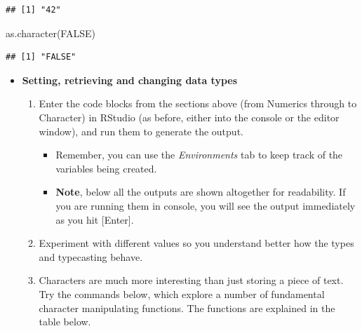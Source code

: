 \documentclass[a4paper]{book}
\newenvironment{Shaded}{}{}
\newcommand{\KeywordTok}[1]{\textcolor[rgb]{0.00,0.00,1.00}{{#1}}}
\newcommand{\OtherTok}[1]{\textcolor[rgb]{1.00,0.25,0.00}{{#1}}}
\newcommand{\NormalTok}[1]{{#1}}
\providecommand{\tightlist}{%
  \setlength{\itemsep}{0pt}\setlength{\parskip}{0pt}}
\newlength{\leftbarwidth}
\newlength{\leftbarsep}
\newcommand*{\leftbarcolorcmd}{\color{darkgray}}%
\renewenvironment{leftbar}{%
    \def\FrameCommand{{\leftbarcolorcmd{\vrule width \leftbarwidth\relax\hspace {\leftbarsep}}}}%
    \MakeFramed {\advance \hsize -\width \FrameRestore }%
}{%
    \endMakeFramed
}
\renewenvironment{Shaded}
{\vspace{0em}\begin{leftbar}\begin{snugshade}}
{\end{snugshade}\end{leftbar}\vspace{0pt}}
\newenvironment{rmdblock}[1]
  {\vspace{1.5em}\begin{shaded*}
  \begin{itemize}
  \renewcommand{\labelitemi}{
    \raisebox{-.7\height}[0pt][0pt]{
      {\setkeys{Gin}{width=3em,keepaspectratio}\texttt{[image: images/\#1]}}
    }
  }
  \item
  }
  {
  \end{itemize}
  \end{shaded*}
  }
\newenvironment{rmdexercise}
  {\begin{rmdblock}{exercise}}
  {\end{rmdblock}}
\begin{document}
\begin{verbatim}
## [1] "42"
\end{verbatim}

\begin{Shaded}
\begin{Highlighting}[]
\KeywordTok{as.character}\NormalTok{(}\OtherTok{FALSE}\NormalTok{)}
\end{Highlighting}
\end{Shaded}

\begin{verbatim}
## [1] "FALSE"
\end{verbatim}

\begin{rmdexercise}
\textbf{Setting, retrieving and changing data types}

\begin{enumerate}
\def\labelenumi{\arabic{enumi}.}
\item
  Enter the code blocks from the sections above (from Numerics through
  to Character) in RStudio (as before, either into the console or the
  editor window), and run them to generate the output.

  \begin{itemize}
  \tightlist
  \item
    Remember, you can use the \emph{Environments} tab to keep track of
    the variables being created.
  \item
    \textbf{Note}, below all the outputs are shown altogether for
    readability. If you are running them in console, you will see the
    output immediately as you hit {[}Enter{]}.
  \end{itemize}
\item
  Experiment with different values so you understand better how the
  types and typecasting behave.
\item
  Characters are much more interesting than just storing a piece of
  text. Try the commands below, which explore a number of fundamental
  character manipulating functions. The functions are explained in the
  table below.
\end{enumerate}
\end{rmdexercise}
\end{document}
